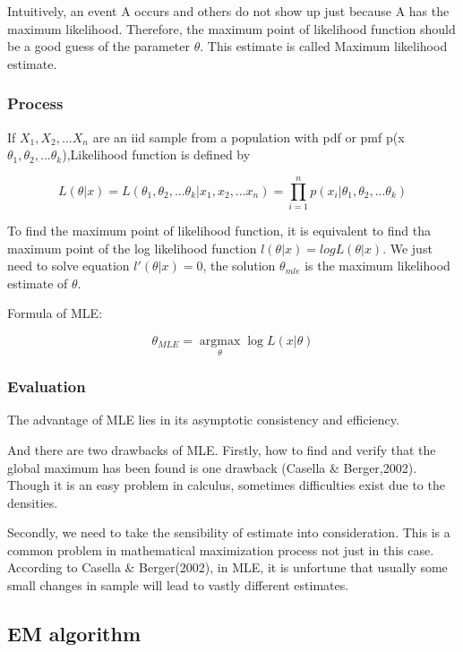\documentclass[
]{article}
\begin{document}
Intuitively, an event A occurs and others do not show up just because A
has the maximum likelihood. Therefore, the maximum point of likelihood
function should be a good guess of the parameter \(\theta\). This
estimate is called Maximum likelihood estimate.

\hypertarget{process}{%
\subsubsection{Process}\label{process}}

If \(X_1,X_2,...X_n\) are an iid sample from a population with pdf or
pmf p(x\textbar{}\(\theta_1,\theta_2,...\theta_k\)),Likelihood function
is defined by

\[L(\theta|x)=L(\theta_1,\theta_2,...\theta_k|x_1,x_2,...x_n)=\prod_{i=1}^{n}p(x_i|\theta_1,\theta_2,...\theta_k)\]

To find the maximum point of likelihood function, it is equivalent to
find tha maximum point of the log likelihood function
\(l(\theta|x)=logL(\theta|x)\). We just need to solve equation
\(l'(\theta|x)=0\), the solution \(\theta_{mle}\) is the maximum
likelihood estimate of \(\theta\).

Formula of MLE:

\[\theta_{MLE}=\mathop{argmax}\limits _{\theta}\log{L(x|\theta)}\]

\hypertarget{evaluation}{%
\subsubsection{Evaluation}\label{evaluation}}

The advantage of MLE lies in its asymptotic consistency and efficiency.

And there are two drawbacks of MLE. Firstly, how to find and verify that
the global maximum has been found is one drawback (Casella \&
Berger,2002). Though it is an easy problem in calculus, sometimes
difficulties exist due to the densities.

Secondly, we need to take the sensibility of estimate into
consideration. This is a common problem in mathematical maximization
process not just in this case. According to Casella \& Berger(2002), in
MLE, it is unfortune that usually some small changes in sample will lead
to vastly different estimates.

\hypertarget{em-algorithm}{%
\subsection{EM algorithm}\label{em-algorithm}}
\end{document}
